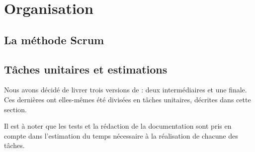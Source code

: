 \section{Organisation}
	\subsection{La méthode Scrum}

	
	\subsection{Tâches unitaires et estimations}
	\label{sec:taches_unitaires}

	Nous avons décidé de livrer trois versions de \glasir{} : deux intermédiaires et une finale. Ces dernières ont elles-mêmes été divisées en tâches unitaires, décrites dans cette section. 
	
	Il est à noter que les tests et la rédaction de la documentation sont pris en compte dans l'estimation du temps nécessaire à la réalisation de chacune des tâches.
	

